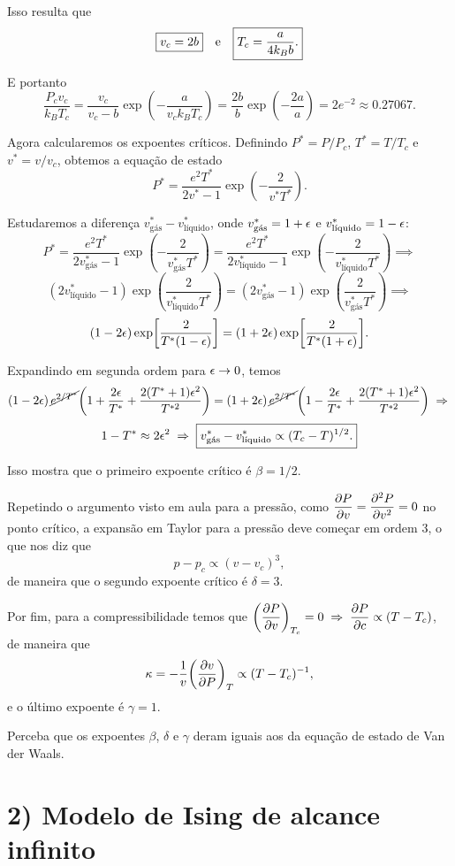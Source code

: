 \documentclass[a4paper,10pt]{article}
\newcommand{\vg}{v_{\text{gás}}^*}
\newcommand{\vl}{v_{\text{líquido}}^*}
\begin{document}
Isso resulta que
$$
\boxed{v_c = 2b} \quad \mathrm{e} \quad \boxed{T_c = \frac{a}{4 k_B b}.}
$$

E portanto
$$
\boxed{ \frac{P_c v_c}{k_B T_c} =\frac{v_c}{v_c-b} \exp(-\frac{a}{v_c k_B T_c}) =
\frac{2b}{b} \exp(-\frac{2a}{a}) = 2 e^{-2} \approx 0.27067. }
$$

Agora calcularemos os expoentes críticos. Definindo $P^* = P/P_c$, $T^* = T/T_c$ e $v^* = v/v_c$, obtemos a equação de estado
$$
P^* = \frac{e^2 T^*}{2 v^* - 1} \exp(-\frac{2}{v^* T^*}).
$$

Estudaremos a diferença $\vg - \vl$, onde $\vg = 1+\eps$ e $\vl = 1-\eps$:
$$
P^* = \frac{e^2 T^*}{2 \vg - 1} \exp(-\frac{2}{\vg T^*}) = \frac{e^2 T^*}{2 \vl - 1} \exp(-\frac{2}{\vl T^*}) \implies
$$
$$
(2 \vl - 1) \exp(\frac{2}{\vl T^*}) = (2 \vg - 1) \exp(\frac{2}{\vg T^*}) \implies
$$
$$
(1-2\epsilon) \exp[\frac{2}{T^* (1-\epsilon)}] = (1 + 2\epsilon) \exp[\frac{2}{T^* (1+\epsilon)}].
$$

Expandindo em segunda ordem para $\epsilon \to 0$, temos
$$
(1-2\epsilon) \, \cancel{e^{2/T^*}} \qty( 1 + \frac{2\epsilon}{T^*} + \frac{2 (T^*+1) \epsilon^2}{T^{*2}}) = (1 + 2\epsilon) \, \cancel{e^{2/T^*}} \qty( 1 - \frac{2\epsilon}{T^*} + \frac{2 (T^*+1) \epsilon^2}{T^{*2}} )
\; \Rightarrow \;
$$
$$
1 - T^* \approx 2 \eps^2 \implies \boxed{ \vg - \vl \propto (T_c - T)^{1/2}. }
$$

Isso mostra que o primeiro expoente crítico é $\beta = 1/2$.

\n

Repetindo o argumento visto em aula para a pressão, como $\displaystyle{\pdv{P}{v} = \pdv[2]{P}{v} = 0}$ no ponto crítico, a expansão em Taylor para a pressão deve começar em ordem 3, o que nos diz que
$$
p - p_c \propto (v - v_c)^3,
$$
de maneira que o segundo expoente crítico é $\delta = 3$.

\n

Por fim, para a compressibilidade temos que $\displaystyle{\qty(\pdv{P}{v})_{T_c} = 0 \; \Rightarrow \;\pdv{P}{c} \propto (T - T_c)}$, de maneira que
$$
\kappa = -\frac{1}{v} \qty(\pdv{v}{P})_{T} \propto (T-T_c)^{-1},
$$
e o último expoente é $\gamma = 1$.

\n

Perceba que os expoentes $\beta$, $\delta$ e $\gamma$ deram iguais aos da equação de estado de Van der Waals.

\pagebreak

\section*{2) Modelo de Ising de alcance infinito}
\end{document}
